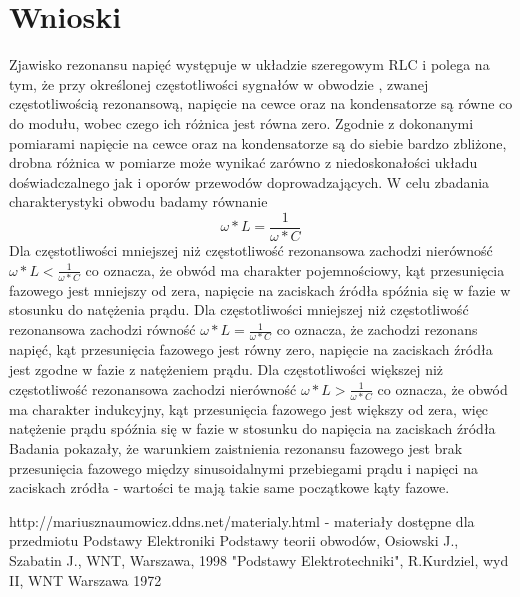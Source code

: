 \documentclass[polish,a4paper]{article}
\begin{document}
\section{Wnioski}
Zjawisko rezonansu napięć występuje w układzie szeregowym RLC i polega na tym, że przy określonej częstotliwości sygnałów w obwodzie , zwanej częstotliwością rezonansową, napięcie na cewce oraz na kondensatorze są równe co do modułu, wobec czego ich różnica jest równa zero. Zgodnie z dokonanymi pomiarami napięcie na cewce oraz na kondensatorze są do siebie bardzo zbliżone, drobna różnica w pomiarze może wynikać zarówno z niedoskonałości układu doświadczalnego jak i oporów przewodów doprowadzających.
\newline
\newline
W celu zbadania charakterystyki obwodu badamy równanie 
$$\omega*L=\frac{1}{\omega*C}$$
Dla częstotliwości mniejszej niż częstotliwość rezonansowa zachodzi nierówność $\omega*L<\frac{1}{\omega*C}$ co oznacza, że obwód ma charakter pojemnościowy, kąt przesunięcia fazowego jest mniejszy od zera, napięcie na zaciskach źródła spóźnia się w fazie w stosunku do natężenia prądu.
\newline
\newline
Dla częstotliwości mniejszej niż częstotliwość rezonansowa zachodzi równość $\omega*L=\frac{1}{\omega*C}$ co oznacza, że zachodzi rezonans napięć, kąt przesunięcia fazowego jest równy zero, napięcie na zaciskach źródła jest zgodne w fazie z natężeniem prądu.
\newline
\newline
Dla częstotliwości większej niż częstotliwość rezonansowa zachodzi nierówność $\omega*L>\frac{1}{\omega*C}$ co oznacza, że obwód ma charakter indukcyjny, kąt przesunięcia fazowego jest większy od zera, więc natężenie prądu spóźnia się w fazie w stosunku do napięcia na zaciskach źródła
\newline
\newline
Badania pokazały, że warunkiem zaistnienia rezonansu fazowego jest brak przesunięcia fazowego między sinusoidalnymi przebiegami prądu i napięci na zaciskach zródła - wartości te mają takie same początkowe kąty fazowe. 

\begin{thebibliography}{3}
 http://mariusznaumowicz.ddns.net/materialy.html - materiały dostępne dla przedmiotu Podstawy Elektroniki
Podstawy teorii obwodów, Osiowski J., Szabatin J., WNT, Warszawa, 1998
"Podstawy Elektrotechniki", R.Kurdziel, wyd II, WNT Warszawa 1972
\end{thebibliography}

\newpage
\tableofcontents{}
\end{document}
